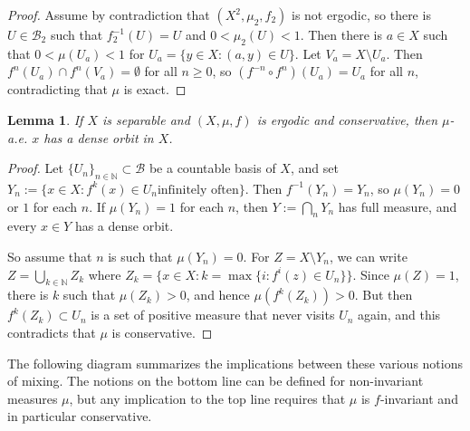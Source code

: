 \documentclass[12pt, psamsfonts, reqno]{amsart}
\newtheorem{lemma}[theorem]{Lemma}
\begin{document}
\begin{proof}
 Assume by contradiction that $(X^2,\mu_2,f_2)$ is not
 ergodic, so there is $U \in {{\mathcal B}}_2$ such that $f_2^{-1}(U) = U$ and $0
 < \mu_2(U) < 1$. Then there is $a \in X$ such that $0 < \mu(U_a) <
 1$ for $U_a = \{ y \in X : (a,y)  \in U\}$. Let $V_a = X \setminus
 U_a$. Then $f^n(U_a) \cap f^n(V_a) = \emptyset$ for all $n \geq
 0$, so $(f^{-n} \circ f^n)(U_a) = U_a$ for all $n$, contradicting
 that $\mu$ is exact.
\end{proof}

\begin{lemma}\label{lem:stronger}
 If $X$ is separable and $(X,\mu,f)$
 is ergodic and conservative, then $\mu$-a.e.
 $x$ has a dense orbit in $X$.
\end{lemma}

\begin{proof}
 Let $\{ U_n \}_{n \in {{\mathbb N}}} \subset {{\mathcal B}}$ be a countable basis of
 $X$, and set $Y_n := \{ x \in X : f^k(x) \in U_n \text{
 infinitely often}\}$. Then $f^{-1}(Y_n) = Y_n$, so $\mu(Y_n) =
 0$ or $1$ for each $n$. If $\mu(Y_n) = 1$ for each $n$, then $Y
 := \bigcap_n Y_n$ has full measure, and every $x \in Y$ has a dense
 orbit.

 So assume that $n$ is such that $\mu(Y_n) = 0$. For $Z = X
 \setminus Y_n$, we can write $Z = \bigcup_{k \in {{\mathbb N}}} Z_k$ where $Z_k
 = \{ x \in X : k = \max\{ i : f^i(z) \in U_n\} \}$. Since
 $\mu(Z) = 1$, there is $k$ such that $\mu(Z_k) > 0$, and hence
 $\mu(f^k(Z_k)) > 0$. But then $f^k(Z_k) \subset U_n$ is a set of
 positive measure that never visits $U_n$ again, and this
 contradicts that $\mu$ is conservative.
\end{proof}

The following diagram summarizes the implications between these various notions
of mixing. The notions on the bottom line can be defined for
non-invariant measures $\mu$, but any implication to the top line requires
that $\mu$ is $f$-invariant and in particular conservative.
\end{document}
